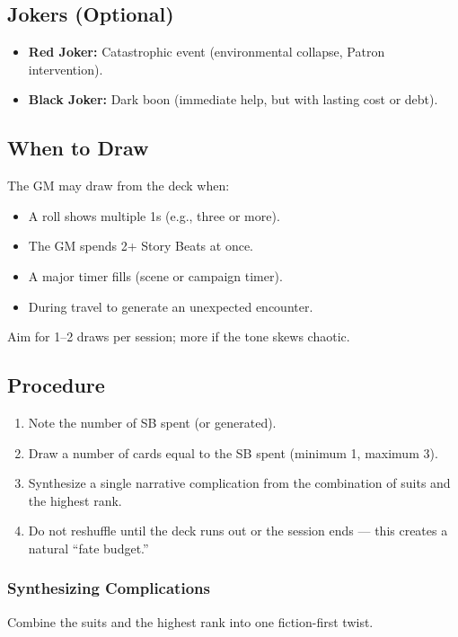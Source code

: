 \subsection{Jokers (Optional)}

\begin{itemize}
  \item \textbf{Red Joker:} Catastrophic event (environmental collapse, Patron intervention).
  \item \textbf{Black Joker:} Dark boon (immediate help, but with lasting cost or debt).
\end{itemize}

\subsection{When to Draw}

The GM may draw from the deck when:
\begin{itemize}
  \item A roll shows multiple 1s (e.g., three or more).
  \item The GM spends 2+ Story Beats at once.
  \item A major timer fills (scene or campaign timer).
  \item During travel to generate an unexpected encounter.
\end{itemize}

Aim for 1--2 draws per session; more if the tone skews chaotic.

\subsection{Procedure}

\begin{enumerate}
  \item Note the number of SB spent (or generated).
  \item Draw a number of cards equal to the SB spent (minimum 1, maximum 3).
  \item Synthesize a single narrative complication from the combination of suits and the highest rank.
  \item Do not reshuffle until the deck runs out or the session ends --- this creates a natural ``fate budget.''
\end{enumerate}

\subsubsection{Synthesizing Complications}
Combine the suits and the highest rank into one fiction-first twist.


